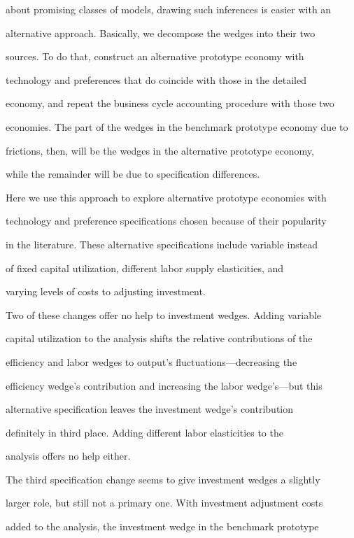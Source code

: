 \documentclass[fleqn,leqno,11pt]{article}
\begin{document}
about promising classes of models, drawing such inferences is easier with an

alternative approach. Basically, we decompose the wedges into their two

sources. To do that, construct an alternative prototype economy with

technology and preferences that do coincide with those in the detailed

economy, and repeat the business cycle accounting procedure with those two

economies. The part of the wedges in the benchmark prototype economy due to

frictions, then, will be the wedges in the alternative prototype economy,

while the remainder will be due to specification differences.



Here we use this approach to explore alternative prototype economies with

technology and preference specifications chosen because of their popularity

in the literature. These alternative specifications include variable instead

of fixed capital utilization, different labor supply elasticities, and

varying levels of costs to adjusting investment.



Two of these changes offer no help to investment wedges. Adding variable

capital utilization to the analysis shifts the relative contributions of the

efficiency and labor wedges to output's fluctuations---decreasing the

efficiency wedge's contribution and increasing the labor wedge's---but this

alternative specification leaves the investment wedge's contribution

definitely in third place. Adding different labor elasticities to the

analysis offers no help either.



The third specification change seems to give investment wedges a slightly

larger role, but still not a primary one. With investment adjustment costs

added to the analysis, the investment wedge in the benchmark prototype
\end{document}

